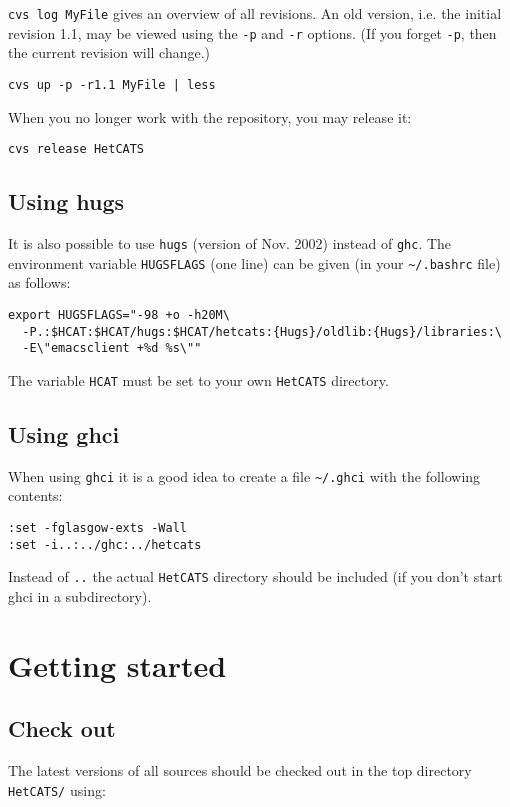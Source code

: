 \documentclass{article}
\begin{document}
\texttt{cvs log MyFile} gives an overview of all revisions. An old
version, i.e. the initial revision 1.1, may be viewed using the
\texttt{-p} and \texttt{-r} options. (If you forget \texttt{-p}, then the
current revision will change.)

\begin{verbatim}
cvs up -p -r1.1 MyFile | less
\end{verbatim}

When you no longer work with the repository, you may release it:

\begin{verbatim}
cvs release HetCATS
\end{verbatim}

\subsection{Using hugs}

It is also possible to use \texttt{hugs} (version of Nov. 2002) instead of
\texttt{ghc}.  The environment variable \texttt{HUGSFLAGS} (one line) can be
given (in your \texttt{\~{}/.bashrc} file) as follows:

\begin{verbatim}
export HUGSFLAGS="-98 +o -h20M\
  -P.:$HCAT:$HCAT/hugs:$HCAT/hetcats:{Hugs}/oldlib:{Hugs}/libraries:\
  -E\"emacsclient +%d %s\""
\end{verbatim}

The variable \texttt{HCAT} must be set to your own \texttt{HetCATS} directory.

\subsection{Using ghci}

When using \texttt{ghci} it is a good idea to create a file
\texttt{\~{}/.ghci} with the following contents:

\begin{verbatim}
:set -fglasgow-exts -Wall 
:set -i..:../ghc:../hetcats
\end{verbatim}

Instead of \texttt{..} the actual \texttt{HetCATS} directory should be
included (if you don't start ghci in a subdirectory).

\section{Getting started}

\subsection{Check out}
The latest versions of all sources should be checked out in the top
directory \texttt{HetCATS/} using:
\end{document}
